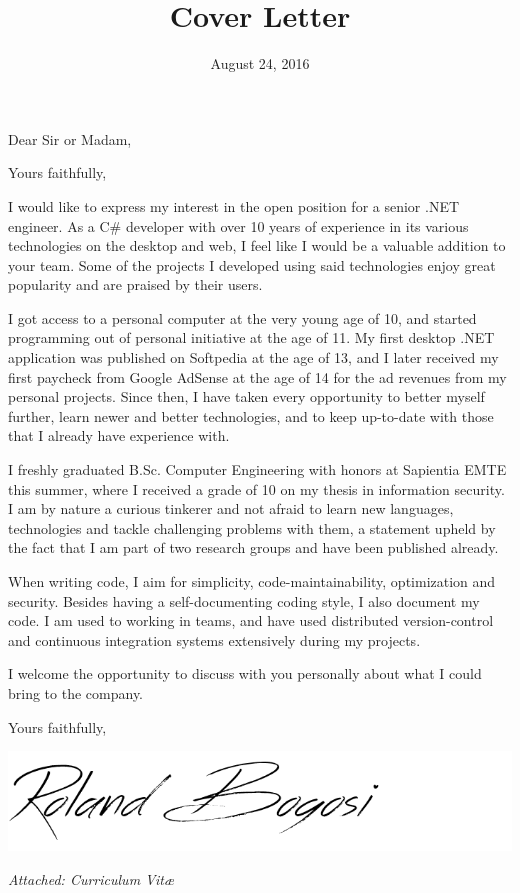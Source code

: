 \documentclass[11pt,a4paper,sans]{moderncv}
\title{Cover Letter}
\begin{document}
\date{August 24, 2016}
\opening{Dear Sir or Madam,}
\closing{Yours faithfully,}
\makelettertitle

\setlength{\parindent}{3ex}

I would like to express my interest in the open position for a senior .NET engineer. As a C\# developer with over 10 years of experience in its various technologies on the desktop and web, I feel like I would be a valuable addition to your team. Some of the projects I developed using said technologies enjoy great popularity and are praised by their users.

I got access to a personal computer at the very young age of 10, and started programming out of personal initiative at the age of 11. My first desktop .NET application was published on Softpedia at the age of 13, and I later received my first paycheck from Google AdSense at the age of 14 for the ad revenues from my personal projects. Since then, I have taken every opportunity to better myself further, learn newer and better technologies, and to keep up-to-date with those that I already have experience with.

I freshly graduated B.Sc. Computer Engineering with honors at Sapientia EMTE this summer, where I received a grade of 10 on my thesis in information security. I am by nature a curious tinkerer and not afraid to learn new languages, technologies and tackle challenging problems with them, a statement upheld by the fact that I am part of two research groups and have been published already.

When writing code, I aim for simplicity, code-maintainability, optimization and security. Besides having a self-documenting coding style, I also document my code. I am used to working in teams, and have used distributed version-control and continuous integration systems extensively during my projects.

I welcome the opportunity to discuss with you personally about what I could bring to the company.

\setlength{\parindent}{0ex}
\vspace{2ex}


Yours faithfully,

\vspace{3ex}
\includegraphics[scale=0.3]{signature.png}

\vfil
{\color{color2}\itshape Attached: Curriculum Vit\ae{}}
\end{document}
